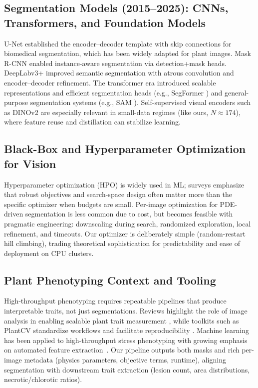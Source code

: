 \documentclass[11pt,a4paper]{article}
\begin{document}
\subsection{Segmentation Models (2015--2025): CNNs, Transformers, and Foundation Models}
U-Net \citep{ronneberger2015u} established the encoder--decoder template with skip connections for biomedical segmentation, which has been widely adapted for plant images. Mask R-CNN \citep{he2017mask} enabled instance-aware segmentation via detection+mask heads. DeepLabv3+ \citep{chen2018deeplabv3plus} improved semantic segmentation with atrous convolution and encoder--decoder refinement. The transformer era introduced scalable representations and efficient segmentation heads (e.g., SegFormer \citep{xie2021segformer}) and general-purpose segmentation systems (e.g., SAM \citep{kirillov2023segment}). Self-supervised visual encoders such as DINOv2 \citep{oquab2023dinov2} are especially relevant in small-data regimes (like ours, $N\approx 174$), where feature reuse and distillation can stabilize learning.

\subsection{Black-Box and Hyperparameter Optimization for Vision}
Hyperparameter optimization (HPO) is widely used in ML; surveys \citep{yu2020hyperparam} emphasize that robust objectives and search-space design often matter more than the specific optimizer when budgets are small. Per-image optimization for PDE-driven segmentation is less common due to cost, but becomes feasible with pragmatic engineering: downscaling during search, randomized exploration, local refinement, and timeouts. Our optimizer is deliberately simple (random-restart hill climbing), trading theoretical sophistication for predictability and ease of deployment on CPU clusters.

\subsection{Plant Phenotyping Context and Tooling}
High-throughput phenotyping requires repeatable pipelines that produce interpretable traits, not just segmentations. Reviews highlight the role of image analysis in enabling scalable plant trait measurement \citep{gehan2017high,mahlein2016plant}, while toolkits such as PlantCV standardize workflows and facilitate reproducibility \citep{plantcv2025}. Machine learning has been applied to high-throughput stress phenotyping with growing emphasis on automated feature extraction~\citep{singh2016machine}. Our pipeline outputs both masks and rich per-image metadata (physics parameters, objective terms, runtime), aligning segmentation with downstream trait extraction (lesion count, area distributions, necrotic/chlorotic ratios).
\end{document}
